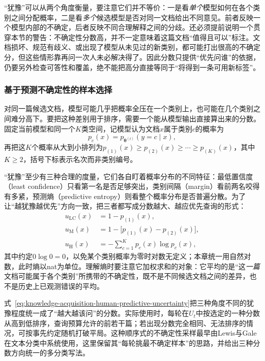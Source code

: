 “犹豫”可以从两个角度衡量，要注意它们并不等价：一是看\emph{单个}模型如何在各个类别之间分配概率，二是看\emph{多个}候选模型是否对同一文档给出不同意见。前者反映一个模型内部的不确定，后者反映不同合理解释之间的分歧。还必须提前说明一个贯穿本节的警告：不确定性分数高，并不一定意味着这篇文档“值得且可以”标注。文档损坏、规范有歧义、或出现了模型从未见过的新类别，都可能打出很高的不确定分，但这些情形靠再问一次人未必解决得了。因此分数只提供“优先问谁”的依据，仍要另外检查可答性和覆盖，绝不能把高分直接等同于“将得到一条可用新标签”。

\subsubsection{基于预测不确定性的样本选择}
\label{sec:knowledge-acquisition-human-predictive-uncertainty}

对同一篇候选文档，模型可能几乎把概率全压在一个类别上，也可能在几个类别之间难分高下。要把这种差别用于排序，需要一个能从模型输出直接算出来的分数。固定当前模型和同一个$K$类空间，记模型认为文档$x$属于类别$c$的概率为
\[
  p_c(x)=p_{\bm{\theta}^{(t)}}(y=c\mid x),
\]
再把这$K$个概率从大到小排列为$p_{(1)}(x)\geq p_{(2)}(x)\geq\cdots\geq p_{(K)}(x)$，其中$K\geq2$，括号下标表示名次而非类别编号。

“犹豫”至少有三种合理的度量，它们各自盯着概率分布的不同特征：最低置信度（least confidence）只看第一名是否足够突出，类别间隔（margin）看前两名咬得有多紧，预测熵（predictive entropy）则看整个概率分布是否普遍分散。为了让“越犹豫越优先”方向一致，把三者都写成分数越大、越应优先查询的形式：
\begin{equation}
  \begin{aligned}
    u_{\mathrm{LC}}(x)
      &=1-p_{(1)}(x),\\
    u_{\mathrm{M}}(x)
      &=1-\bigl[p_{(1)}(x)-p_{(2)}(x)\bigr],\\
    u_{\mathrm{H}}(x)
      &=-\sum_{c=1}^{K}p_c(x)\log p_c(x),
  \end{aligned}
  \label{eq:knowledge-acquisition-human-predictive-uncertainty}
\end{equation}
其中约定$0\log0=0$，以免某个类别概率为零时对数无定义；本章统一用自然对数，此时熵以nat为单位。理解熵时要注意它加权求和的对象：它平均的是“这\emph{一篇}文档可能属于各个类别”所携带的不确定性，既不是不同候选文档之间的差异，也不是历史上已观测错误的平均。

式~\eqref{eq:knowledge-acquisition-human-predictive-uncertainty}把三种角度不同的犹豫程度统一成了“越大越该问”的分数。实际使用时，每轮在$U_t$中按选定的一种分数从高到低排序，查询预算允许的前若干篇；若出现分数完全相同、无法排序的情况，可按事先约定随机打破平局。这种顺序式的不确定性采样最早由Lewis与Gale在文本分类中系统使用，这里保留其“每轮挑最不确定样本”的思路，并给出三种分数方向统一的多分类写法。

